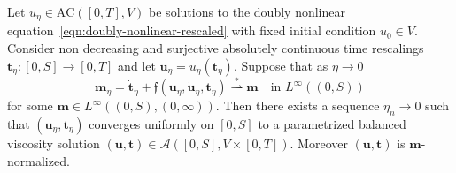 \begin{thm}
Let $u_\eta\in\text{AC}([0,T],V)$ be solutions to the doubly nonlinear equation~\eqref{eqn:doubly-nonlinear-rescaled} with fixed initial condition $u_0\in V$. Consider non decreasing and surjective absolutely continuous time rescalings $\boldsymbol{t}_\eta\colon[0,S]\to[0,T]$ and let $\boldsymbol{u}_\eta=u_\eta(\boldsymbol{t}_\eta)$. Suppose that as $\eta\to0$
\begin{equation}
\label{eqn:normalization-hp}
\boldsymbol{m}_\eta=\dot{\boldsymbol{t}}_\eta+\mathfrak{f}(\boldsymbol{u}_\eta,\dot{\boldsymbol{u}}_\eta,\boldsymbol{t}_\eta)\overset{*}{\rightharpoonup}\boldsymbol{m}\quad\text{in $L^\infty((0,S))$}
\end{equation}
for some $\boldsymbol{m}\in L^\infty((0,S),(0,\infty))$. Then there exists a sequence $\eta_n\to0$ such that $(\boldsymbol{u}_\eta,\boldsymbol{t}_\eta)$ converges uniformly on $[0,S]$ to a parametrized balanced viscosity solution $(\boldsymbol{u},\boldsymbol{t})\in\mathscr{A}([0,S],V\times[0,T])$. Moreover $(\boldsymbol{u},\boldsymbol{t})$ is $\boldsymbol{m}$-normalized.
\end{thm}
